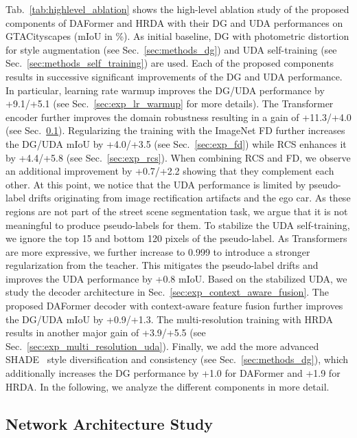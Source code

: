 \documentclass[journal,compsoc]{IEEEtran}
\begin{document}
Tab.~\ref{tab:highlevel_ablation} shows the high-level ablation study of the proposed components of DAFormer and HRDA with their DG and UDA performances on GTACityscapes (mIoU in \%). As initial baseline, DG with photometric distortion for style augmentation (see Sec.~\ref{sec:methods_dg}) and UDA self-training (see Sec.~\ref{sec:methods_self_training}) are used.
Each of the proposed components results in successive significant improvements of the DG and UDA performance. In particular, learning rate warmup improves the DG/UDA performance by +9.1/+5.1 (see Sec.~\ref{sec:exp_lr_warmup} for more details). The Transformer encoder further improves the domain robustness resulting in a gain of +11.3/+4.0 (see Sec.~\ref{sec:exp_comparison_networks}). Regularizing the training with the ImageNet FD further increases the DG/UDA mIoU by +4.0/+3.5 (see Sec.~\ref{sec:exp_fd}) while RCS enhances it by +4.4/+5.8 (see Sec.~\ref{sec:exp_rcs}). When combining RCS and FD, we observe an additional improvement by +0.7/+2.2 showing that they complement each other. At this point, we notice that the UDA performance is limited by pseudo-label drifts originating from image rectification artifacts and the ego car. As these regions are not part of the street scene segmentation task, we argue that it is not meaningful to produce pseudo-labels for them. 
To stabilize the UDA self-training, we ignore the top 15 and bottom 120 pixels of the pseudo-label. As Transformers are more expressive, we further increase  to 0.999 to introduce a stronger regularization from the teacher. This mitigates the pseudo-label drifts and improves the UDA performance by +0.8 mIoU. Based on the stabilized UDA, we study the decoder architecture in Sec.~\ref{sec:exp_context_aware_fusion}. The proposed DAFormer decoder with context-aware feature fusion further improves the DG/UDA mIoU by +0.9/+1.3. The multi-resolution training with HRDA results in another major gain of +3.9/+5.5 (see Sec.~\ref{sec:exp_multi_resolution_uda}). 
Finally, we add the more advanced SHADE~\cite{zhao2022style} style diversification and consistency (see Sec.~\ref{sec:methods_dg}), which additionally increases the DG performance by +1.0 for DAFormer and +1.9 for HRDA.
In the following, we analyze the different components in more detail.

\subsection{Network Architecture Study}
\label{sec:exp_comparison_networks}
\end{document}
